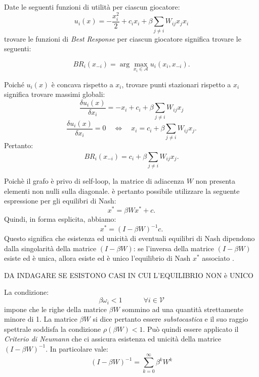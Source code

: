 \begin{alphaparts}
   \questionpart
   Date le seguenti funzioni di utilità per ciascun giocatore:
   \[
    u_i(x)=- \frac{x_i^2}{2}+ c_i x_i + \beta \sum\limits_{j \neq i} W_{ij}x_j x_i 
    \]
    trovare le funzioni di \textit{Best Response} per ciascun giocatore significa trovare le seguenti:

    \[BR_i(x_{ - i}) = \arg\max_{x_i \in \mathcal{A}} u_i(x_i, x_{ - i}).\]

    Poiché \(u_i(x)\) è concava rispetto a \(x_i\), trovare punti stazionari rispetto a \(x_i\) significa trovare massimi globali:
    \[
        \frac{\delta u_i ( x )}{\delta x_i} = -x_i + c_i + \beta  \sum \limits_{j \neq i}^{} W_{ij} x_j
    \]
    \[
        \frac{\delta u_i ( x )}{\delta x_i} = 0 \quad \iff \quad x_i = c_i + \beta  \sum \limits_{j \neq i}^{} W_{ij} x_j
    .\]
    Pertanto:
    \[
        BR_i(x_{-i}) = c_i + \beta  \sum \limits_{j \neq i}^{} W_{ij}x_j 
    .\]

    \questionpart
    Poichè il grafo è privo di self-loop, la matrice di adiacenza \(W\) non presenta elementi non nulli sulla diagonale. è pertanto possibile utilizzare la seguente espressione per gli equilibri di Nash:
    \begin{equation}\label{eq_nash}
        x^* = \beta W x^* + c
    .\end{equation}
    Quindi, in forma esplicita, abbiamo:
    \begin{equation*}
        x^* = (I -\beta W)^{-1} c
    .\end{equation*}
    Questo significa che esistenza ed unicità di eventuali equilibri di Nash dipendono dalla singolarità della matrice \((I - \beta W)\): se l'inversa della matrice \((I - \beta W)\) esiste ed è unica, allora esiste ed è unico l'equilibrio di Nash \(x^*\) associato .

    DA INDAGARE SE ESISTONO CASI IN CUI L'EQUILIBRIO NON è UNICO

    La condizione:
    \begin{equation}
        \beta \omega_i < 1 \quad \quad \quad \forall i \in \mathcal{V}
    \end{equation}
    impone che le righe della matrice \(\beta W\) sommino ad una quantità strettamente minore di 1. La matrice \(\beta W\) si dice pertanto essere \textit{substocastica} e il suo raggio spettrale soddisfa la condizione \(\rho(\beta W) < 1\). Può quindi essere applicato il \textit{Criterio di Neumann} che ci assicura esistenza ed unicità della matrice \((I - \beta W)^{-1}\). In particolare vale:
    \begin{equation}
        (I-\beta W)^{-1} =  \sum \limits_{k=0}^{\infty} \beta^k W^k
    \end{equation}

\end{alphaparts}